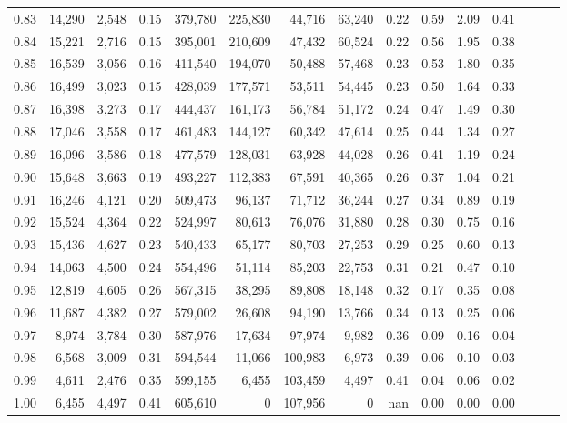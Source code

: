 \begin{tabular}{rrrrrrrrrrrrrrr}
0.83 &  14,290 &  2,548 &  0.15 &  379,780 &  225,830 &   44,716 &   63,240 &  0.22 &  0.59 &  2.09 &      0.41 \\
0.84 &  15,221 &  2,716 &  0.15 &  395,001 &  210,609 &   47,432 &   60,524 &  0.22 &  0.56 &  1.95 &      0.38 \\
0.85 &  16,539 &  3,056 &  0.16 &  411,540 &  194,070 &   50,488 &   57,468 &  0.23 &  0.53 &  1.80 &      0.35 \\
0.86 &  16,499 &  3,023 &  0.15 &  428,039 &  177,571 &   53,511 &   54,445 &  0.23 &  0.50 &  1.64 &      0.33 \\
0.87 &  16,398 &  3,273 &  0.17 &  444,437 &  161,173 &   56,784 &   51,172 &  0.24 &  0.47 &  1.49 &      0.30 \\
0.88 &  17,046 &  3,558 &  0.17 &  461,483 &  144,127 &   60,342 &   47,614 &  0.25 &  0.44 &  1.34 &      0.27 \\
0.89 &  16,096 &  3,586 &  0.18 &  477,579 &  128,031 &   63,928 &   44,028 &  0.26 &  0.41 &  1.19 &      0.24 \\
0.90 &  15,648 &  3,663 &  0.19 &  493,227 &  112,383 &   67,591 &   40,365 &  0.26 &  0.37 &  1.04 &      0.21 \\
0.91 &  16,246 &  4,121 &  0.20 &  509,473 &   96,137 &   71,712 &   36,244 &  0.27 &  0.34 &  0.89 &      0.19 \\
0.92 &  15,524 &  4,364 &  0.22 &  524,997 &   80,613 &   76,076 &   31,880 &  0.28 &  0.30 &  0.75 &      0.16 \\
0.93 &  15,436 &  4,627 &  0.23 &  540,433 &   65,177 &   80,703 &   27,253 &  0.29 &  0.25 &  0.60 &      0.13 \\
0.94 &  14,063 &  4,500 &  0.24 &  554,496 &   51,114 &   85,203 &   22,753 &  0.31 &  0.21 &  0.47 &      0.10 \\
0.95 &  12,819 &  4,605 &  0.26 &  567,315 &   38,295 &   89,808 &   18,148 &  0.32 &  0.17 &  0.35 &      0.08 \\
0.96 &  11,687 &  4,382 &  0.27 &  579,002 &   26,608 &   94,190 &   13,766 &  0.34 &  0.13 &  0.25 &      0.06 \\
0.97 &   8,974 &  3,784 &  0.30 &  587,976 &   17,634 &   97,974 &    9,982 &  0.36 &  0.09 &  0.16 &      0.04 \\
0.98 &   6,568 &  3,009 &  0.31 &  594,544 &   11,066 &  100,983 &    6,973 &  0.39 &  0.06 &  0.10 &      0.03 \\
0.99 &   4,611 &  2,476 &  0.35 &  599,155 &    6,455 &  103,459 &    4,497 &  0.41 &  0.04 &  0.06 &      0.02 \\
1.00 &   6,455 &  4,497 &  0.41 &  605,610 &        0 &  107,956 &        0 &   nan &  0.00 &  0.00 &      0.00 \\
\bottomrule
\end{tabular}
